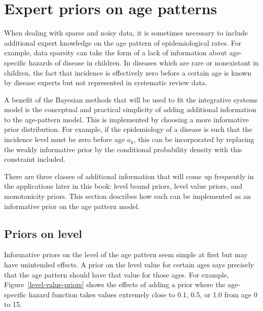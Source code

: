 \chapter{Expert priors on age patterns}
\label{theory-expert_priors}

When dealing with sparse and noisy data, it is sometimes necessary to
include additional expert knowledge on the age pattern of
epidemiological rates.  For example, data sparsity can take the form
of a lack of information about age-specific hazards of disease in children.  In
diseases which are rare or nonexistant in children, the fact that incidence is
effectively zero before a certain age is known by disease experts but
not represented in systematic review data.

A benefit of the Bayesian methods that will be used to fit the
integrative systems model is the conceptual and practical simplicity
of adding additional information to the age-pattern model.  This is
implemented by choosing a more informative prior distribution.  For
example, if the epidemiology of a disease is such that the incidence
level must be zero before age $a_k$, this can be incorporated by
replacing the weakly informative prior by the conditional probability
density with this constraint included.

There are three classes of additional information that will come up
frequently in the applications later in this book: level bound priors,
level value priors, and monotonicity priors. This section describes
how each can be implemented as an informative prior on the age pattern
model.


\section{Priors on level}

Informative priors on the level of the age pattern seem simple at
first but may have unintended effects.  A prior on the level value for
certain ages says precisely that the age pattern should have that
value for those ages.  For example, Figure~\ref{level-value-priors}
shows the effects of adding a prior where the age-specific hazard function takes values extremely
close to 0.1, 0.5, or 1.0 from age 0 to 15.


